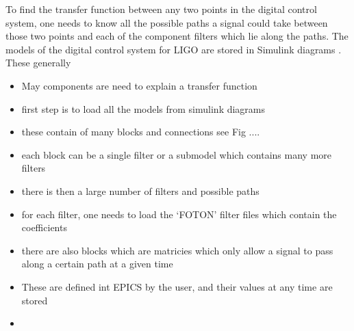 To find the transfer function between any two points in the digital control system, one needs to know all the possible paths a signal could take between those two points and each of the component filters which lie along the paths.
The models of the digital control system for \gls{LIGO} are stored in Simulink diagrams \citep{}.
These generally 

\begin{itemize}
	\item May components are need to explain a transfer function
	\item first step is to load all the models from simulink diagrams
	\item these contain of many blocks and connections see Fig ....
	\item each block can be a single filter or a submodel which contains many more filters
	\item there is then a large number of filters and possible paths
	\item for each filter, one needs to load the `FOTON' filter files which contain the coefficients 
	\item there are also blocks which are matricies which only allow a signal to pass along a certain path at a given time
	\item These are defined int EPICS by the user, and their values at any time are stored
	\item 
\end{itemize}

